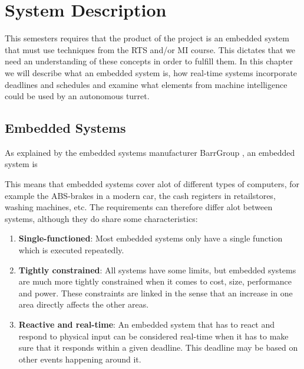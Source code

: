 \chapter{System Description}

This semesters requires that the product of the project is an embedded system
that must use techniques from the RTS and/or MI course. This dictates that we
need an understanding of these concepts in order to fulfill them. In this
chapter we will describe what an embedded system is, how real-time systems
incorporate deadlines and schedules and examine what elements from machine
intelligence could be used by an autonomous turret.

\section{Embedded Systems}
As explained by the embedded systems manufacturer BarrGroup
\citep{Barr_Embedded}, an embedded system is \nl {}\nl
% 

This means that embedded systems cover alot of different types of computers, for example
the ABS-brakes in a modern car, the cash registers in retailstores, washing machines, etc.
The requirements can therefore differ alot between systems, although they do
share some characteristics\citep[ch.1.1]{vahid1999embedded}:

\begin{enumerate}
  \item \textbf{Single-functioned}:  Most embedded systems only have a single
  function which is executed repeatedly.
  \item \textbf{Tightly constrained}: All systems have some limits, but
  embedded systems are much more tightly constrained when it comes to cost,
  size, performance and power. These constraints are linked in the sense that
  an increase in one area directly affects the other areas.
  \item \textbf{Reactive and real-time}: An embedded system that has to react
  and respond to physical input can be considered real-time when it has to make
  sure that it responds within a given deadline. This deadline may be based on
  other events happening around it.
\end{enumerate}
